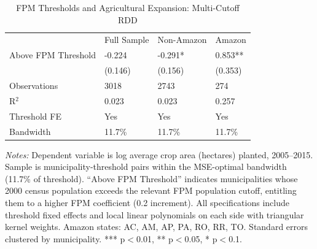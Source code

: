 \begin{table}[htbp]
\small
\centering
\caption{FPM Thresholds and Agricultural Expansion: Multi-Cutoff RDD}
\label{tab:tab2_main_rdd}
\begin{tabular}{llll}
& Full Sample & Non-Amazon & Amazon \\
Above FPM Threshold & -0.224 & -0.291* & 0.853** \\
& (0.146) & (0.156) & (0.353) \\
Observations & 3018 & 2743 & 274 \\
R$^2$ & 0.023 & 0.023 & 0.257 \\
Threshold FE & Yes & Yes & Yes \\
Bandwidth & 11.7\% & 11.7\% & 11.7\% \\
\end{tabular}
\begin{minipage}{0.95\textwidth}
\vspace{4pt}\scriptsize
\textit{Notes:} Dependent variable is log average crop area (hectares) planted, 2005--2015. Sample is municipality-threshold pairs within the MSE-optimal bandwidth (11.7\% of threshold). ``Above FPM Threshold'' indicates municipalities whose 2000 census population exceeds the relevant FPM population cutoff, entitling them to a higher FPM coefficient (0.2 increment). All specifications include threshold fixed effects and local linear polynomials on each side with triangular kernel weights. Amazon states: AC, AM, AP, PA, RO, RR, TO. Standard errors clustered by municipality. *** p$<$0.01, ** p$<$0.05, * p$<$0.1.
\end{minipage}
\end{table}
